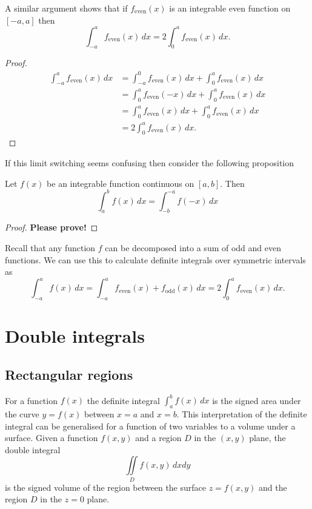 \documentclass[10pt, a4paper]{article}
\begin{document}
A similar argument shows that if $f_{\text{even}}(x)$ is an integrable even function on $[-a, a]$ then
\[
\int_{-a}^{a}f_{\text{even}}(x)\,dx = 2\int_0^af_{\text{even}}(x)\,dx.
\]
\begin{proof}
    \begin{align*}
        \int_{-a}^{a}f_{\text{even}}(x)\,dx &= \int_{-a}^{0}f_{\text{even}}(x)\,dx + \int_{0}^{a}f_{\text{even}}(x)\,dx \\
        &= \int_{0}^{a}f_{\text{even}}(-x)\,dx + \int_{0}^{a}f_{\text{even}}(x)\,dx \\
        &= \int_{0}^{a}f_{\text{even}}(x)\,dx + \int_{0}^{a}f_{\text{even}}(x)\,dx \\
        &= 2\int_{0}^{a}f_{\text{even}}(x)\,dx.
    \end{align*}
\end{proof}

If this limit switching seems confusing then consider the following proposition
\begin{proposition}
    Let $f(x)$ be an integrable function continuous on $[a, b]$.
    Then
    \[
    \int_{a}^{b}f(x)\,dx = \int_{-b}^{-a}f(-x)\,dx
    \]
    \begin{proof}
        \large \textbf{Please prove!}
    \end{proof}
\end{proposition}

Recall that any function $f$ can be decomposed into a sum of odd and even functions.
We can use this to calculate definite integrals over symmetric intervals as
\[
\int_{-a}^{a}f(x)\,dx = \int_{-a}^{a}f_{\text{even}}(x) + f_{\text{odd}}(x)\,dx = 2\int_0^af_{\text{even}}(x)\,dx.
\]

\newpage

\section{Double integrals}

\subsection{Rectangular regions}
For a function $f(x)$ the definite integral $\int_a^bf(x)\,dx$ is the signed area under the curve $y = f(x)$ between $x = a$ and $x = b$.
This interpretation of the definite integral can be generalised for a function of two variables to a volume under a surface.
Given a function $f(x, y)$ and a region $D$ in the $(x, y)$ plane,
the double integral
\[
\iint\limits_Df(x, y)\,dxdy
\]
is the signed volume of the region between the surface $z = f(x, y)$ and the region $D$ in the $z = 0$ plane.
\end{document}
